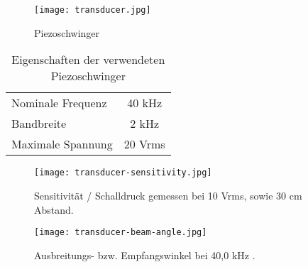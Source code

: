 \begin{figure}[H]
\centering
\texttt{[image: transducer.jpg]}
\caption{Piezoschwinger\cite{ImgPiezo}}
\label{fig:Piezo}
\end{figure}

\begin{table}[H]
\caption{Eigenschaften der verwendeten Piezoschwinger}
\label{tab:PiezoProperties}
\centering
\setlength{\tabcolsep}{5mm}	%
\def\arraystretch{1.25}			%
\begin{tabular}{lc} 
Nominale Frequenz & 40 kHz\\ 
Bandbreite & 2 kHz\\
Maximale Spannung & 20 Vrms\\
\end{tabular}
\end{table}

\begin{figure}[H]
\centering
\texttt{[image: transducer-sensitivity.jpg]}
\caption{Sensitivität / Schalldruck gemessen bei 10 Vrms, sowie 30 cm Abstand. \cite{ImgPiezoData}}
\label{fig:PiezoSensitivity}
\end{figure}

\begin{figure}[H]
\centering
\texttt{[image: transducer-beam-angle.jpg]}
\caption{Ausbreitungs- bzw. Empfangswinkel bei 40,0 kHz \cite{ImgPiezoData}.}
\label{fig:PiezoBeamAnge}
\end{figure}